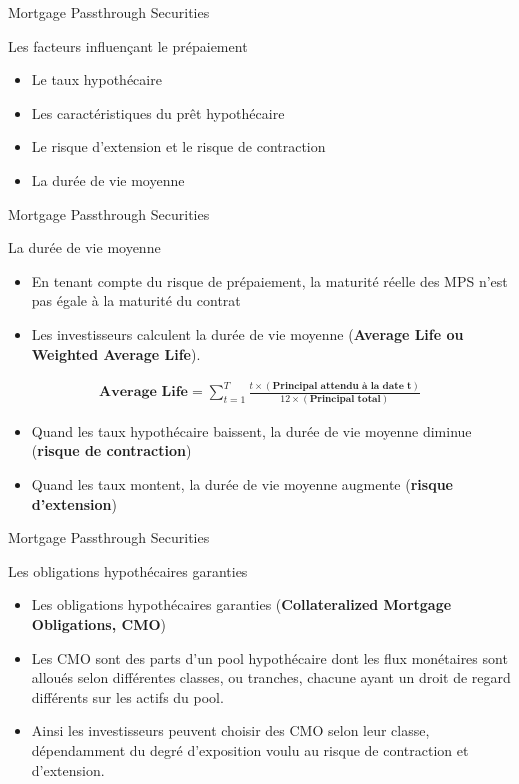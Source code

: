 \documentclass[10pt,a4paper]{beamer}
\begin{document}
\begin{frame}{Mortgage Passthrough Securities}
\begin{block}{Les facteurs influençant le prépaiement}
\begin{itemize}[label=\bullet]
\item Le taux hypothécaire
\item Les caractéristiques du prêt hypothécaire
\item Le risque d’extension et le risque de contraction
\item La durée de vie moyenne
\end{itemize}
\end{block}
\end{frame}


\begin{frame}{Mortgage Passthrough Securities}
\begin{block}{La durée de vie moyenne}
\begin{itemize}[label=\bullet]
\item En tenant compte du risque de prépaiement, la maturité réelle des MPS n’est pas égale à la maturité du contrat
\item Les investisseurs calculent la durée de vie moyenne (\textbf{Average Life ou Weighted Average Life}).
\end{itemize}
\begin{align*}
\textbf{Average Life}=\sum_{t=1}^T \frac{t \times(\textbf{Principal attendu à la date t})}{12 \times(\textbf{Principal total})}
\end{align*}
\begin{itemize}[label=\bullet]
\item Quand les taux hypothécaire baissent, la durée de vie moyenne diminue (\textbf{risque de contraction})
\item Quand les taux montent, la durée de vie moyenne augmente (\textbf{risque d’extension})
\end{itemize}
\end{block}
\end{frame}


\begin{frame}{Mortgage Passthrough Securities}
\begin{block}{Les obligations hypothécaires garanties}
\begin{itemize}[label=\bullet]
\item Les obligations hypothécaires garanties (\textbf{Collateralized Mortgage Obligations, CMO})
\item Les CMO sont des parts d’un pool hypothécaire dont les flux monétaires sont alloués selon différentes classes, ou tranches, chacune ayant un droit de regard différents sur les actifs du pool.
\item Ainsi les investisseurs peuvent choisir des CMO selon leur classe, dépendamment du degré d’exposition voulu au risque de contraction et d’extension.
\end{itemize}
\end{block}
\end{frame}
\end{document}
